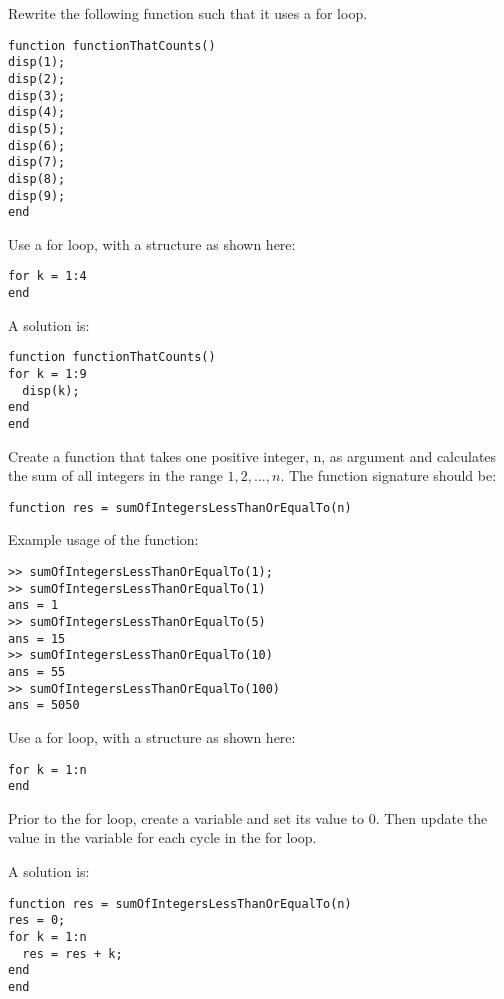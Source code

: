 \begin{ex}
Rewrite the following function such that it uses a for loop.
\begin{lstlisting}
function functionThatCounts()
disp(1);
disp(2);
disp(3);
disp(4);
disp(5);
disp(6);
disp(7);
disp(8);
disp(9);
end
\end{lstlisting}
\begin{hint}
Use a for loop, with a structure as shown here:
\begin{lstlisting}
for k = 1:4
end
\end{lstlisting}
\end{hint}
\begin{sol}
A solution is:
\begin{lstlisting}
function functionThatCounts()
for k = 1:9
  disp(k);
end
end
\end{lstlisting}
\end{sol}
\end{ex}



\begin{ex}
Create \label{exSumOfPositiveIntegersLessThanN}
a function that takes one positive integer, n, as argument and
calculates the sum of all integers in the range $1, 2, ..., n$.
The function signature should be:
\begin{lstlisting}
function res = sumOfIntegersLessThanOrEqualTo(n)
\end{lstlisting}
Example usage of the function:
\begin{lstlisting}
>> sumOfIntegersLessThanOrEqualTo(1);
>> sumOfIntegersLessThanOrEqualTo(1)
ans = 1
>> sumOfIntegersLessThanOrEqualTo(5)
ans = 15
>> sumOfIntegersLessThanOrEqualTo(10)
ans = 55
>> sumOfIntegersLessThanOrEqualTo(100)
ans = 5050
\end{lstlisting}
\begin{hint}
Use a for loop, with a structure as shown here:
\begin{lstlisting}
for k = 1:n
end
\end{lstlisting}
Prior to the for loop, create a variable and set its value to 0.
Then update the value in the variable for each cycle in the for loop.
\end{hint}
\begin{sol}
A solution is:
\begin{lstlisting}
function res = sumOfIntegersLessThanOrEqualTo(n)
res = 0;
for k = 1:n
  res = res + k;
end
end
\end{lstlisting}
\end{sol}
\end{ex}




